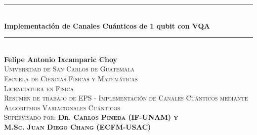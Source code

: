 \documentclass[11pt, spanish, letterpage]{report} %
\date{}
\newcommand{\M}{\mathcal{M}^{(N)}}
\newcommand{\1}{\mathbb{1}}
\begin{document}
\begin{titlepage} %
\newcommand{\HRule}{\rule{\linewidth}{0.5mm}} %

\center %

\HRule \\[0.4cm] %
{\huge\bfseries Implementación de Canales Cuánticos de 1 qubit con VQA\\[0.3cm]} %
\HRule \\[2cm] %



\Large{\textbf{Felipe Antonio Ixcamparic Choy}}\\[2cm] %


\textsc{\LARGE Universidad de San Carlos de Guatemala\\ Escuela de Ciencias Físicas y Matemáticas\\ Licenciatura en Física}\\[2cm]

\textsc{\Large Resumen de trabajo de EPS - Implementación de Canales Cuánticos mediante Algoritmos Variacionales Cuánticos}\\[2cm]
\textsc{\Large Supervisado por: \textbf{Dr. Carlos Pineda (IF-UNAM) y\\M.Sc. Juan Diego Chang (ECFM-USAC)}}
                                                                                                      


\end{titlepage}
\end{document}
